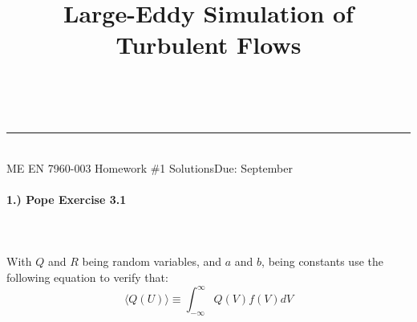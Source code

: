 \documentclass[11pt]{article}
\makeatletter
\newcommand{\linia}{\rule{\linewidth}{0.5pt}}
\renewcommand{\maketitle}{
\begin{center}
\vspace{2ex}
{\huge \textsc{\@title}}
\vspace{1ex}
\\
\linia\\
ME EN 7960-003 \hfill Homework \#1 Solutions\hfill Due: September \nth{20}
\vspace{4ex}
\end{center}
}
\makeatother
\begin{document}
\title{Large-Eddy Simulation of Turbulent Flows}

\maketitle

\vspace{-20pt}
\paragraph{1.) Pope Exercise 3.1}~\\\\
With $Q$ and $R$ being random variables, and $a$ and $b$, being constants use the following equation to verify that:
$$\langle Q(U) \rangle \equiv \int^{\infty}_{-\infty} Q(V) f(V) dV$$
\end{document}
